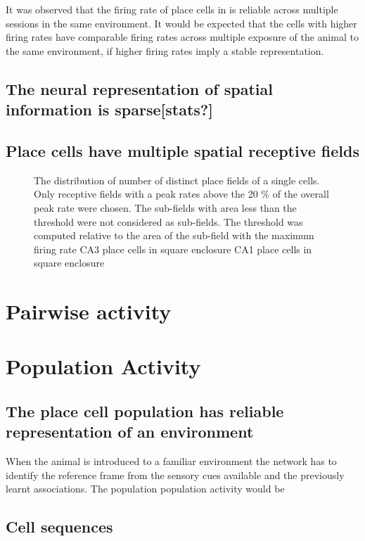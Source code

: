 It was observed that the firing rate of place cells in is reliable across multiple sessions in the same environment. It would be expected that the cells with higher firing rates have comparable firing rates across multiple exposure of the animal to the same environment, if higher firing rates imply a stable representation. 



\subsection*{The neural representation of spatial information is sparse[stats?]}

\subsection*{Place cells have multiple spatial receptive fields}
\begin{figure}[htb!]
\label{fig:nsubfields}
\caption[Multiple fields of Place Cells]{The distribution of number of distinct place fields of a single cells. Only receptive fields with a peak rates above the 20 \% of the overall peak rate were chosen. The sub-fields with area less than the threshold were not considered as sub-fields. The threshold was computed relative to the area of the sub-field with the maximum firing rate  CA3 place cells in square enclosure  CA1 place cells in square enclosure}
\end{figure}

\section{Pairwise activity}

\section{Population Activity}
\subsection*{The place cell population has reliable representation of an environment}
When the animal is introduced to a familiar environment the network has to identify the reference frame from the sensory cues available and the previously learnt associations. The population population activity would be  

\subsection*{Cell sequences}

\section{}


